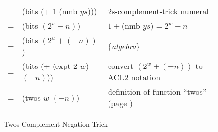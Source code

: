 \begin{figure}
\begin{center}
\end{center}
\begin{center}
\begin{tabular} {lll}
  & (bits (+ 1 (nmb $ys$)))         & 2s-complement-trick numeral          \\
= & (bits $(2^w - n)$)              & $1 + $(nmb $ys$) = $2^w - n$         \\
= & (bits $(2^w + (- n))$)          & \{\emph{algebra}\}                   \\
= & (bits (+ (expt 2 $w$) $(- n)$)) & convert $(2^w + (- n))$ to ACL2 notation \\
= & (twos $w$ $(- n)$)              & definition of function ``twos'' (page \pageref{twos-defun}) \\
\end{tabular}
\end{center}
\caption{Twos-Complement Negation Trick}
\label{fig:2s-comp-negation}
\end{figure}

